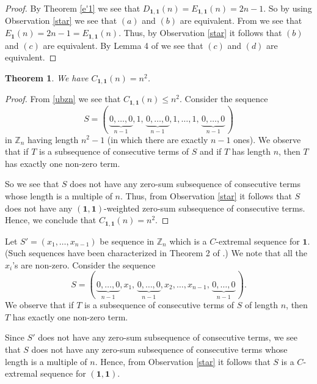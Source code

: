 \documentclass{article}[11pt]
\newtheorem{theorem}{Theorem}[section]
\theoremstyle{definition}
\begin{document}
\begin{proof}
By Theorem \ref{e'1} we see that $D_{\mathbf 1,\mathbf 1}(n)=E_{\mathbf 1,\mathbf 1}(n)=2n-1$. So by using Observation \ref{star} we see that $(a)$ and $(b)$ are equivalent. From \cite{EGZ} we see that $E_\mathbf 1(n)=2n-1=E_{\mathbf 1,\mathbf 1}(n)$. Thus, by Observation \ref{star} it follows that $(b)$ and $(c)$ are equivalent. By Lemma 4 of \cite{BD} we see that $(c)$ and $(d)$ are equivalent.
\end{proof}



\begin{theorem}\label{c'1}
We have $C_{\mathbf 1,\mathbf 1}(n)=n^2$.
\end{theorem}

\begin{proof}
From \eqref{ubzn} we see that $C_{\mathbf 1,\mathbf 1}(n)\leq n^2$. Consider the sequence
\[S=(\,\underbrace{0,\ldots,0}_{n-1},1,\,\underbrace{0,\ldots,0}_{n-1},1,\ldots,1,\,\underbrace{0,\ldots,0}_{n-1}\,)\]
in $\mathbb Z_n$ having length $n^2-1$ (in which there are exactly $n-1$ ones). We observe that if $T$ is a subsequence of consecutive terms of $S$ and if $T$ has length $n$, then $T$ has exactly one non-zero term.

So we see that $S$ does not have any zero-sum subsequence of consecutive terms whose length is a multiple of $n$. Thus, from Observation \ref{star} it follows that $S$ does not have any $(\mathbf 1,\mathbf 1)$-weighted zero-sum subsequence of consecutive terms. Hence, we conclude that $C_{\mathbf 1,\mathbf 1}(n)=n^2$.
\end{proof}


Let $S'=(x_1,\ldots,x_{n-1})$ be sequence in $\mathbb Z_n$ which is a $C$-extremal sequence for $\mathbf 1$. (Such sequences have been characterized in Theorem 2 of \cite{SKS}.) We note that all the $x_i$'s are non-zero. Consider the sequence
\begin{equation}\label{cext}
S=(\,\underbrace{0,\ldots,0}_{n-1},x_1,\,\underbrace{0,\ldots,0}_{n-1},x_2,\ldots,x_{n-1},\,\underbrace{0,\ldots,0}_{n-1}\,).
\end{equation}
We observe that if $T$ is a subsequence of consecutive terms of $S$ of length $n$, then $T$ has exactly one non-zero term.

Since $S'$ does not have any zero-sum subsequence of consecutive terms, we see that $S$ does not have any zero-sum subsequence of consecutive terms whose length is a multiple of $n$. Hence, from Observation \ref{star} it follows that $S$ is a $C$-extremal sequence for $(\mathbf 1,\mathbf 1)$.
\end{document}
